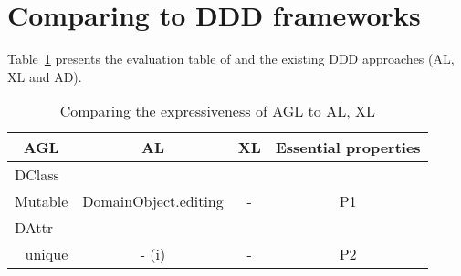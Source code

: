 \section{Comparing to DDD frameworks} \label{apex:compareAGLwithOther}


Table~\ref{tab:Comparing-the-expressiveness} presents the evaluation table of \agldcsl and the existing DDD approaches (AL, XL and AD). 

\begin{table}[]
		\centering
	\caption{Comparing the expressiveness of AGL to AL, XL} \label{tab:Comparing-the-expressiveness}

\begin{tabular}{|rccl|}
\hline
\multicolumn{1}{|c|}{\textbf{AGL}}      & \multicolumn{1}{c|}{\textbf{AL}}                                                                                   & \multicolumn{1}{c|}{\textbf{XL}}                                                                                       & \textbf{Essential properties} \\ \hline
\multicolumn{4}{|l|}{\cellcolor[HTML]{DAE8FC}DClass}                                                                                                                                                                                                                                                                  \\ \hline
\multicolumn{1}{|r|}{Mutable}           & \multicolumn{1}{c|}{DomainObject.editing}                                                                          & \multicolumn{1}{c|}{-}                                                                                                 & \multicolumn{1}{c|}{P1}       \\ \hline
\multicolumn{4}{|l|}{\cellcolor[HTML]{DAE8FC}DAttr}                                                                                                                                                                                                                                                                   \\ \hline
\multicolumn{1}{|r|}{unique}            & \multicolumn{1}{c|}{- (i)}                                                                                         & \multicolumn{1}{c|}{-}                                                                                                 & \multicolumn{1}{c|}{P2}       \\ \hline

\end{tabular}
\end{table}
